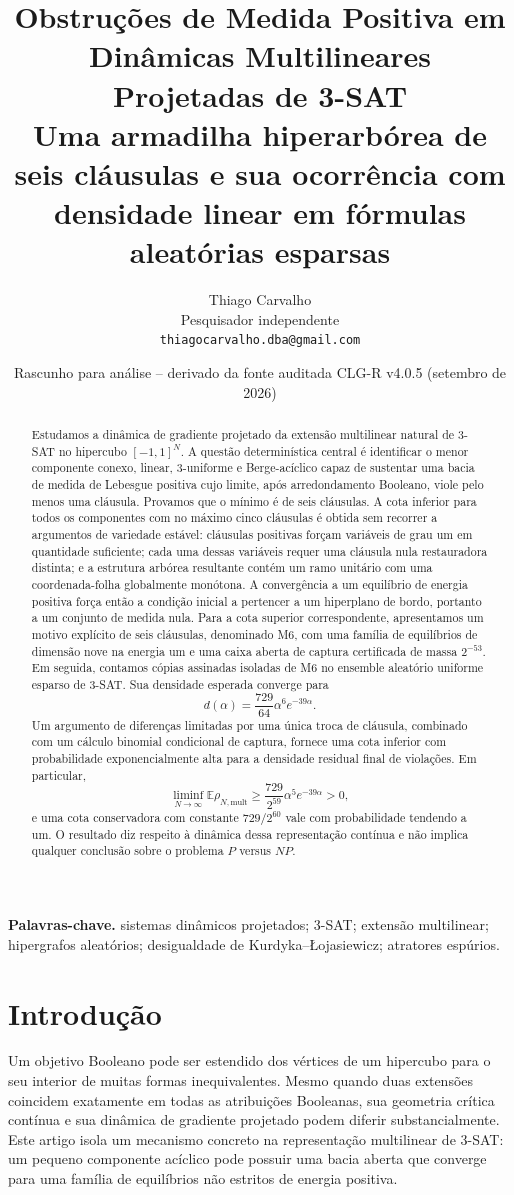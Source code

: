 \documentclass[11pt,a4paper]{article}
\title{\textbf{Obstruções de Medida Positiva em Dinâmicas Multilineares Projetadas de 3-SAT}\\[0.3em]
\large Uma armadilha hiperarbórea de seis cláusulas e sua ocorrência com densidade linear em fórmulas aleatórias esparsas}
\author{Thiago Carvalho\\Pesquisador independente\\\texttt{thiagocarvalho.dba@gmail.com}}
\date{Rascunho para análise -- derivado da fonte auditada CLG-R v4.0.5 (setembro de 2026)}
\begin{document}
\maketitle

\begin{abstract}
Estudamos a dinâmica de gradiente projetado da extensão multilinear natural de 3-SAT no hipercubo $[-1,1]^N$. A questão determinística central é identificar o menor componente conexo, linear, 3-uniforme e Berge-acíclico capaz de sustentar uma bacia de medida de Lebesgue positiva cujo limite, após arredondamento Booleano, viole pelo menos uma cláusula. Provamos que o mínimo é de seis cláusulas. A cota inferior para todos os componentes com no máximo cinco cláusulas é obtida sem recorrer a argumentos de variedade estável: cláusulas positivas forçam variáveis de grau um em quantidade suficiente; cada uma dessas variáveis requer uma cláusula nula restauradora distinta; e a estrutura arbórea resultante contém um ramo unitário com uma coordenada-folha globalmente monótona. A convergência a um equilíbrio de energia positiva força então a condição inicial a pertencer a um hiperplano de bordo, portanto a um conjunto de medida nula. Para a cota superior correspondente, apresentamos um motivo explícito de seis cláusulas, denominado M6, com uma família de equilíbrios de dimensão nove na energia um e uma caixa aberta de captura certificada de massa $2^{-53}$. Em seguida, contamos cópias assinadas isoladas de M6 no ensemble aleatório uniforme esparso de 3-SAT. Sua densidade esperada converge para
\[
 d(\alpha)=\frac{729}{64}\alpha^6 e^{-39\alpha}.
\]
Um argumento de diferenças limitadas por uma única troca de cláusula, combinado com um cálculo binomial condicional de captura, fornece uma cota inferior com probabilidade exponencialmente alta para a densidade residual final de violações. Em particular,
\[
 \liminf_{N\to\infty}\mathbb E\rho_{N,\mathrm{mult}}
 \ge \frac{729}{2^{59}}\alpha^5 e^{-39\alpha}>0,
\]
e uma cota conservadora com constante $729/2^{60}$ vale com probabilidade tendendo a um. O resultado diz respeito à dinâmica dessa representação contínua e não implica qualquer conclusão sobre o problema $P$ versus $NP$.
\end{abstract}

\noindent\textbf{Palavras-chave.} sistemas dinâmicos projetados; 3-SAT; extensão multilinear; hipergrafos aleatórios; desigualdade de Kurdyka--\L{}ojasiewicz; atratores espúrios.

\section{Introdução}
Um objetivo Booleano pode ser estendido dos vértices de um hipercubo para o seu interior de muitas formas inequivalentes. Mesmo quando duas extensões coincidem exatamente em todas as atribuições Booleanas, sua geometria crítica contínua e sua dinâmica de gradiente projetado podem diferir substancialmente. Este artigo isola um mecanismo concreto na representação multilinear de 3-SAT: um pequeno componente acíclico pode possuir uma bacia aberta que converge para uma família de equilíbrios não estritos de energia positiva.
\end{document}
